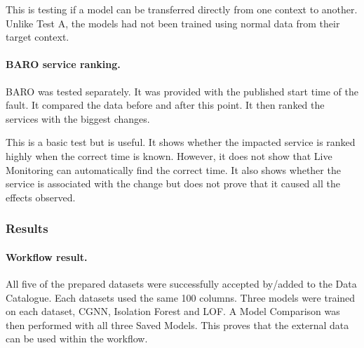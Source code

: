This is testing if a model can be transferred directly from one context to another. Unlike Test A, the models had not been trained using normal data from their target context.

\paragraph{BARO service ranking.}

BARO was tested separately. It was provided with the published start time of the fault. It compared the data before and after this point. It then ranked the services with the biggest changes.

This is a basic test but is useful. It shows whether the impacted service is ranked highly when the correct time is known. However, it does not show that Live Monitoring can automatically find the correct time. It also shows whether the service is associated with the change but does not prove that it caused all the effects observed.

\subsubsection{Results}

\paragraph{Workflow result.}


All five of the prepared datasets were successfully accepted by/added to the Data Catalogue. Each datasets used the same 100 columns. Three models were trained on each dataset, CGNN, Isolation Forest and LOF. A Model Comparison was then performed with all three Saved Models. This proves that the external data can be used within the workflow.

